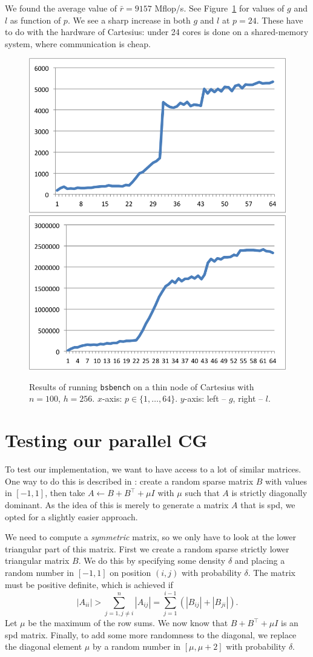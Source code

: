 \documentclass[11pt]{amsart}
\theoremstyle{definition}
\begin{document}
We found the average value of $\bar r = 9157$ Mflop/s. See Figure~\ref{fig:cart} for values of $g$ and $l$ as function of $p$. We see a sharp increase in both $g$ and $l$ at $p=24$. These have to do with the hardware of Cartesius: under 24 cores is done on a shared-memory system, where communication is cheap.

\begin{figure}
  \includegraphics[width=0.49\linewidth]{cartg.png}
  \includegraphics[width=0.49\linewidth]{cartl.png}
  \caption{Results of running \texttt{bsbench} on a thin node of Cartesius with $n=100$, $h=256$. $x$-axis: $p \in \{1, \ldots, 64\}$. $y$-axis: left -- $g$, right -- $l$.}
  \label{fig:cart}
\end{figure}

\section{Testing our parallel CG}
To test our implementation, we want to have access to a lot of similar matrices. One way to do this is described in \cite[Ex.~4.6]{biss04}: create a random sparse matrix $B$ with values in $[-1,1]$, then take $A \gets B + B^\top + \mu I$ with $\mu$ such that $A$ is strictly diagonally dominant. As the idea of this is merely to generate a matrix $A$ that is spd, we opted for a slightly easier approach. 

We need to compute a \emph{symmetric} matrix, so we only have to look at the lower triangular part of this matrix. First we create a random sparse strictly lower triangular matrix $B$. We do this by specifying some density $\delta$ and placing a random number in $[-1,1]$ on position $(i,j)$ with probability $\delta$. The matrix must be positive definite, which is achieved \cite[Ex.~24.2]{trefbau} if
\[
  |A_{ii}| > \sum_{j=1, j\ne i}^n |A_{ij}|= \sum_{j=1}^{i-1} (|B_{ij}| + |B_{ji}|).
\]
Let $\mu$ be the maximum of the row sums. We now know that $B + B^\top + \mu I$ is an spd matrix. Finally, to add some more randomness to the diagonal, we replace the diagonal element $\mu$ by a random number in $[\mu, \mu + 2]$ with probability $\delta$.
\end{document}
